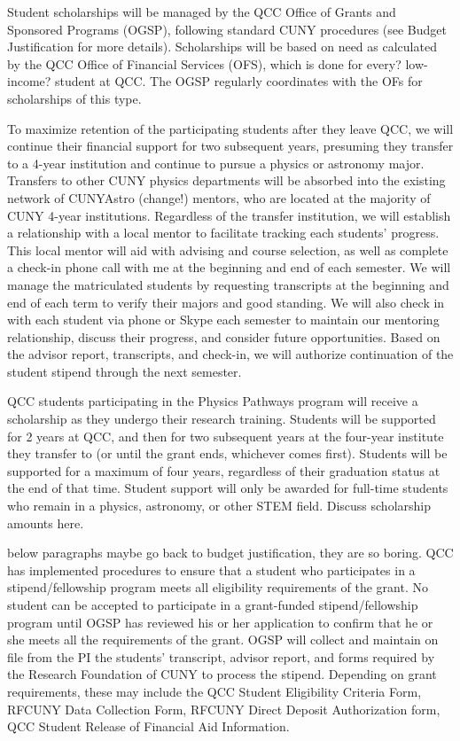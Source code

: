 \documentclass[12pt]{article}
\newcommand\reword[1]{{\color{red}#1}}
\begin{document}
Student scholarships will be managed by the QCC Office of Grants and Sponsored Programs (OGSP), following standard CUNY procedures (see Budget Justification for more details).  Scholarships will be based on need as calculated by the QCC Office of Financial Services (OFS), which is done for \reword{every? low-income?} student at QCC.  The OGSP regularly coordinates with the OFs for scholarships of this type.  


To maximize retention of the participating students after they leave QCC, we will continue their financial support for two subsequent years, presuming they transfer to a 4-year institution and continue to pursue a physics or astronomy major.  Transfers to other CUNY physics departments will be absorbed into the existing network of CUNYAstro (change!) mentors, who are located at the majority of CUNY 4-year institutions.  Regardless of the transfer institution, we will establish a relationship with a local mentor to facilitate tracking each students' progress.  This local mentor will aid with advising and course selection, as well as complete a check-in phone call with me at the beginning and end of each semester.  We will manage the matriculated students by requesting transcripts at the beginning and end of each term to verify their majors and good standing.  We will also check in with each student via phone or Skype each semester to maintain our mentoring relationship, discuss their progress, and consider future opportunities.  Based on the advisor report, transcripts, and check-in, we will authorize continuation of the student stipend through the next semester.  

QCC students participating in the Physics Pathways program will receive a scholarship as they undergo their research training. Students will be supported for 2 years at QCC, and then for two subsequent years at the four-year institute they transfer to (or until the grant ends, whichever comes first).  Students will be supported for a maximum of four years, regardless of their graduation status at the end of that time. Student support will only be awarded for full-time students who remain in a physics, astronomy, or other STEM field.  \reword{Discuss scholarship amounts here.}


\reword{below paragraphs maybe go back to budget justification, they are so boring.}
QCC has implemented procedures to ensure that a student who participates in a stipend/fellowship program meets all eligibility requirements of the grant.  No student can be accepted to participate in a grant-funded stipend/fellowship program until OGSP has reviewed his or her application to confirm that he or she meets all the requirements of the grant.  OGSP will collect and maintain on file from the PI the students' transcript, advisor report, and forms required by the Research Foundation of CUNY to process the stipend.  Depending on grant requirements, these may include the QCC Student Eligibility Criteria Form, RFCUNY Data Collection Form, RFCUNY Direct Deposit Authorization form, QCC Student Release of Financial Aid Information.  
 
\end{document}
